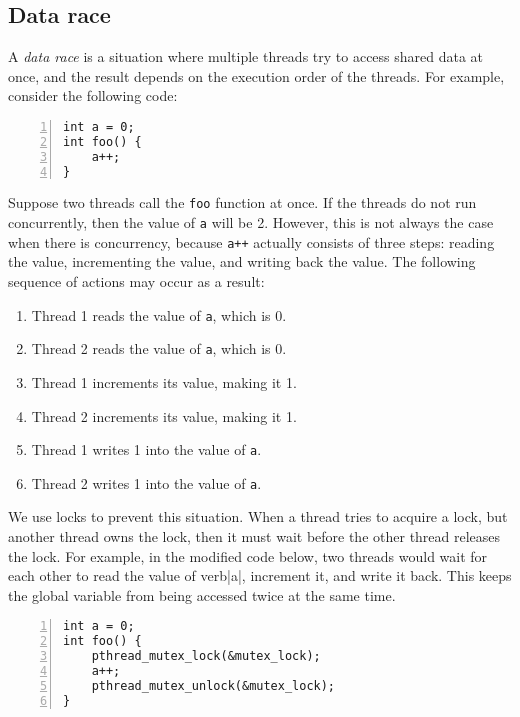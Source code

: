 \subsection{Data race}

A {\it{data race}} is a situation where multiple threads try to access shared data at once, and the result depends on the execution order of the threads. For example, consider the following code:

\begin{lstlisting}[frame=tb, xleftmargin=2em, framexleftmargin=1.5em, numbers=left]
int a = 0;
int foo() {
    a++;
}
\end{lstlisting}

Suppose two threads call the \verb|foo| function at once. If the threads do not run concurrently, then the value of \verb|a| will be 2. However, this is not always the case when there is concurrency, because \verb|a++| actually consists of three steps: reading the value, incrementing the value, and writing back the value. The following sequence of actions may occur as a result: \begin{enumerate}
    \item Thread 1 reads the value of \verb|a|, which is 0.
    \item Thread 2 reads the value of \verb|a|, which is 0.
    \item Thread 1 increments its value, making it 1.
    \item Thread 2 increments its value, making it 1.
    \item Thread 1 writes 1 into the value of \verb|a|.
    \item Thread 2 writes 1 into the value of \verb|a|.
\end{enumerate}

We use locks to prevent this situation. When a thread tries to acquire a lock, but another thread owns the lock, then it must wait before the other thread releases the lock. For example, in the modified code below, two threads would wait for each other to read the value of verb|a|, increment it, and write it back. This keeps the global variable from being accessed twice at the same time.

\begin{lstlisting}[frame=tb, xleftmargin=2em, framexleftmargin=1.5em, numbers=left]
int a = 0;
int foo() {
    pthread_mutex_lock(&mutex_lock);
    a++;
    pthread_mutex_unlock(&mutex_lock);
}
\end{lstlisting}